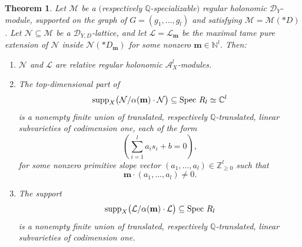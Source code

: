 \documentclass{amsart}
\theoremstyle{plain}
\newtheorem{theorem}{Theorem}
\numberwithin{theorem}{section}
\theoremstyle{definition}
\theoremstyle{remark}
\theoremstyle{definition}
\newcommand{\C}{\mathbb{C}} %
\newcommand{\N}{\mathbb{N}}
\newcommand{\Q}{\mathbb{Q}}
\newcommand{\Z}{\mathbb{Z}}
\newcommand{\cL}{\mathcal{L}}
\newcommand{\cM}{\mathcal{M}}
\newcommand{\cN}{\mathcal{N}}
\newcommand{\bm}{\mathbf{m}}
\newcommand{\sA}{\mathscr{A}}
\newcommand{\shD}{\mathscr{D}}
\newcommand{\Spec}{\textup{Spec }}
\newcommand{\supp}{\textup{supp}}
\begin{document}
   


\begin{theorem}\label{thm:latticemtqsupp}
Let $\cM$ be a $($respectively
$\Q$-specializable$)$ regular holonomic $\shD_Y$-module, supported on the graph of
$G=(g_1,\dots,g_l)$
and satisfying $\cM=\cM(*D)$. Let $\cN\subseteq \cM$ be a
$\shD_{Y,D}$-lattice, and let $\cL=\cL_{\bm}$ be the maximal tame pure extension
of $\cN$ inside $\cN(*D_{\bm})$ for some nonzero $\bm\in \N^l$. Then:
\begin{enumerate}[label=$(\arabic*)$]
    \item $\cN$ and $\cL$ are relative regular holonomic $\sA_X^l$-modules.

    \item The top-dimensional part of
    \[
    \supp_X\big(\cN/\alpha(\bm)\cdot\cN\big)
    \subseteq
    \Spec R_l\simeq \C^l
    \]
    is a nonempty finite union of translated, respectively $\Q$-translated,
    linear subvarieties of codimension one, each of the form
    \[
    \left(\sum_{i=1}^l a_i s_i+b=0\right),
    \]
    for some nonzero primitive slope vector
    $(a_1,\dots,a_l)\in \Z_{\ge 0}^l$
    such that
    \[\bm\cdot (a_1,\dots,a_l)\neq 0.\]
    \item The support
    \[
    \supp_X\big(\cL/\alpha(\bm)\cdot\cL\big)
    \subseteq
    \Spec R_l
    \]
    is a nonempty finite union of translated, respectively $\Q$-translated,
    linear subvarieties of codimension one.
\end{enumerate}
\end{theorem}
\end{document}
